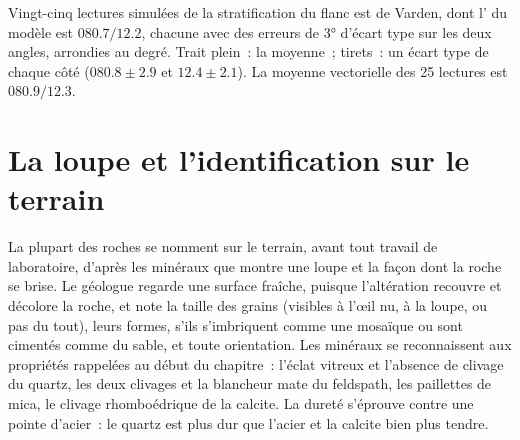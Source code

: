 \begin{omfigure}

{\small Vingt-cinq lectures simulées de la stratification du flanc est de Varden,
dont l' du modèle est $080.7/12.2$, chacune avec des erreurs de \ang{3}
d'écart type sur les deux angles, arrondies au degré. Trait plein~: la moyenne~;
tirets~: un écart type de chaque côté ($080.8 \pm 2.9$ et $12.4 \pm 2.1$). La
moyenne vectorielle des 25 lectures est $080.9/12.3$.}
\end{omfigure}

\section{La loupe et l'identification sur le terrain}

La plupart des roches se nomment sur le terrain, avant tout travail de
laboratoire, d'après les minéraux que montre une loupe et la façon dont la roche
se brise. Le géologue regarde une surface fraîche, puisque l'altération recouvre
et décolore la roche, et note la taille des grains (visibles à l'œil nu, à la
loupe, ou pas du tout), leurs formes, s'ils s'imbriquent comme une mosaïque ou
sont cimentés comme du sable, et toute orientation. Les minéraux se reconnaissent
aux propriétés rappelées au début du chapitre~: l'éclat vitreux et l'absence de
clivage du quartz, les deux clivages et la blancheur mate du feldspath, les
paillettes de mica, le clivage rhomboédrique de la calcite. La dureté s'éprouve
contre une pointe d'acier~: le quartz est plus dur que l'acier et la calcite bien
plus tendre.

